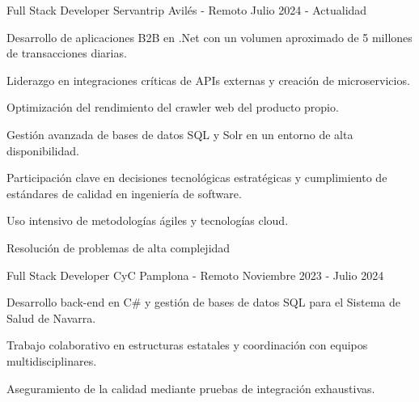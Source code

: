 
\begin{cventries}
    \cventry
    {Full Stack Developer} %
    {Servantrip} %
    {Avilés - Remoto} %
    {Julio 2024 - Actualidad} %
    {
        \begin{cvitems} %
            \item {Desarrollo de aplicaciones B2B en .Net con un volumen aproximado de 5 millones de transacciones diarias.}
            \item {Liderazgo en integraciones críticas de APIs externas y creación de microservicios.}
            \item {Optimización del rendimiento del crawler web del producto propio.}
            \item {Gestión avanzada de bases de datos SQL y Solr en un entorno de alta disponibilidad.}
            \item {Participación clave en decisiones tecnológicas estratégicas y cumplimiento de estándares de calidad en ingeniería de software.}
            \item {Uso intensivo de metodologías ágiles y tecnologías cloud.}
            \item {Resolución de problemas de alta complejidad}
        \end{cvitems}
    }
    \cventry
    {Full Stack Developer} %
    {CyC} %
    {Pamplona - Remoto} %
    {Noviembre 2023 - Julio 2024} %
    {
        \begin{cvitems}
            \item {Desarrollo back-end en C# y gestión de bases de datos SQL para el Sistema de Salud de Navarra.}
            \item {Trabajo colaborativo en estructuras estatales y coordinación con equipos multidisciplinares.}
            \item {Aseguramiento de la calidad mediante pruebas de integración exhaustivas.}
        \end{cvitems}
}
\end{cventries}
